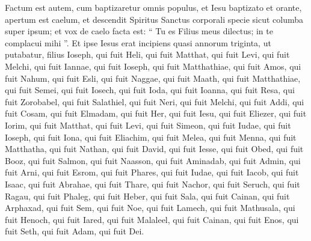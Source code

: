 \begin{biblechapter}
\begin{biblechapter}
\begin{biblechapter}
 \verse Factum est autem, cum baptizaretur omnis populus, et Iesu baptizato et orante, apertum est caelum, 
\verse et descendit Spiritus Sanctus corporali specie sicut columba super ipsum; et vox de caelo facta est: “ Tu es Filius meus dilectus; in te complacui mihi ”.
 \verse Et ipse Iesus erat incipiens quasi annorum triginta, ut putabatur, filius Ioseph, qui fuit Heli, 
\verse qui fuit Matthat, qui fuit Levi, qui fuit Melchi, qui fuit Iannae, qui fuit Ioseph, 
\verse qui fuit Matthathiae, qui fuit Amos, qui fuit Nahum, qui fuit Esli, qui fuit Naggae, 
\verse qui fuit Maath, qui fuit Matthathiae, qui fuit Semei, qui fuit Iosech, qui fuit Ioda, 
\verse qui fuit Ioanna, qui fuit Resa, qui fuit Zorobabel, qui fuit Salathiel, qui fuit Neri, 
 \verse qui fuit Melchi, qui fuit Addi, qui fuit Cosam, qui fuit Elmadam, qui fuit Her, 
\verse qui fuit Iesu, qui fuit Eliezer, qui fuit Iorim, qui fuit Matthat, qui fuit Levi, 
\verse qui fuit Simeon, qui fuit Iudae, qui fuit Ioseph, qui fuit Iona, qui fuit Eliachim, 
\verse qui fuit Melea, qui fuit Menna, qui fuit Matthatha, qui fuit Nathan, qui fuit David, 
\verse qui fuit Iesse, qui fuit Obed, qui fuit Booz, qui fuit Salmon, qui fuit Naasson, 
\verse qui fuit Aminadab, qui fuit Admin, qui fuit Arni, qui fuit Esrom, qui fuit Phares, qui fuit Iudae, 
\verse qui fuit Iacob, qui fuit Isaac, qui fuit Abrahae, qui fuit Thare, qui fuit Nachor, 
\verse qui fuit Seruch, qui fuit Ragau, qui fuit Phaleg, qui fuit Heber, qui fuit Sala, 
\verse qui fuit Cainan, qui fuit Arphaxad, qui fuit Sem, qui fuit Noe, qui fuit Lamech, 
\verse qui fuit Mathusala, qui fuit Henoch, qui fuit Iared, qui fuit Malaleel, qui fuit Cainan, 
\verse qui fuit Enos, qui fuit Seth, qui fuit Adam, qui fuit Dei.
 

\end{biblechapter}
\end{biblechapter}
\end{biblechapter}
